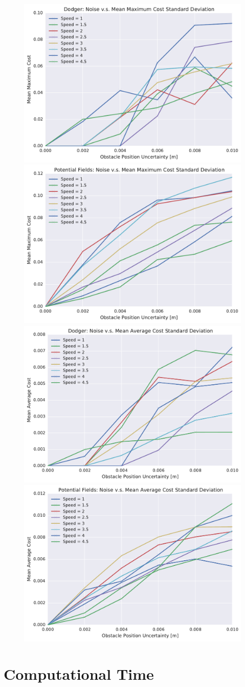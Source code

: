 \begin{figure}[h!]
    \centering
    \includegraphics[width=0.48\linewidth]{figs/planner_std_max_cost_0}
    \includegraphics[width=0.48\linewidth]{figs/pf_std_max_cost_0} \\
    \includegraphics[width=0.48\linewidth]{figs/planner_std_avg_cost_0}
    \includegraphics[width=0.48\linewidth]{figs/pf_std_avg_cost_0}
    \caption{}
    \label{fig:plot_std_cost}
\end{figure}

\section{Computational Time}

